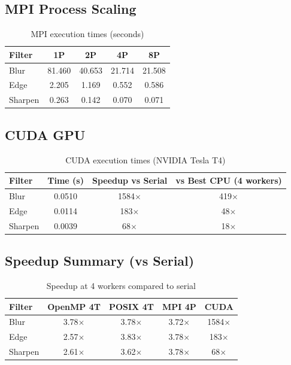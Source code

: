 \documentclass[12pt, a4paper]{article}
\begin{document}
\subsection{MPI Process Scaling}

\begin{table}[H]
\centering
\caption{MPI execution times (seconds)}
\begin{tabular}{lcccc}
\toprule
\textbf{Filter} & \textbf{1P} & \textbf{2P} & \textbf{4P} & \textbf{8P} \\
\midrule
Blur    & 81.460 & 40.653 & 21.714 & 21.508 \\
Edge    & 2.205  & 1.169  & 0.552  & 0.586 \\
Sharpen & 0.263  & 0.142  & 0.070  & 0.071 \\
\bottomrule
\end{tabular}
\end{table}

\subsection{CUDA GPU}

\begin{table}[H]
\centering
\caption{CUDA execution times (NVIDIA Tesla T4)}
\begin{tabular}{lccc}
\toprule
\textbf{Filter} & \textbf{Time (s)} & \textbf{Speedup vs Serial} & \textbf{vs Best CPU (4 workers)} \\
\midrule
Blur    & 0.0510 & 1584$\times$ & 419$\times$ \\
Edge    & 0.0114 & 183$\times$  & 48$\times$ \\
Sharpen & 0.0039 & 68$\times$   & 18$\times$ \\
\bottomrule
\end{tabular}
\end{table}

\subsection{Speedup Summary (vs Serial)}

\begin{table}[H]
\centering
\caption{Speedup at 4 workers compared to serial}
\begin{tabular}{lcccc}
\toprule
\textbf{Filter} & \textbf{OpenMP 4T} & \textbf{POSIX 4T} & \textbf{MPI 4P} & \textbf{CUDA} \\
\midrule
Blur    & 3.78$\times$ & 3.78$\times$ & 3.72$\times$ & 1584$\times$ \\
Edge    & 2.57$\times$ & 3.83$\times$ & 3.78$\times$ & 183$\times$ \\
Sharpen & 2.61$\times$ & 3.62$\times$ & 3.78$\times$ & 68$\times$ \\
\bottomrule
\end{tabular}
\end{table}
\end{document}
